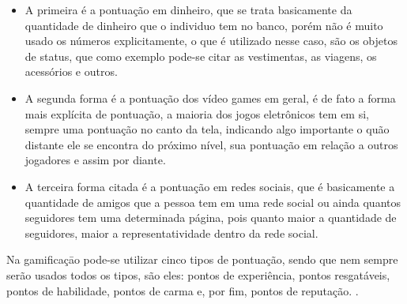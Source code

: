 	 \begin{itemize}
	 	\item  A primeira é a pontuação em dinheiro, que se trata basicamente da quantidade de dinheiro que o individuo tem no banco, porém não é muito usado os números explicitamente, o que é utilizado nesse caso, são os objetos de status, que como exemplo pode-se citar as vestimentas, as viagens, os acessórios e outros.
	 	
	 	\item A segunda forma é a pontuação dos vídeo games em geral, é de fato a forma mais explícita de pontuação, a maioria dos jogos eletrônicos tem em si, sempre uma pontuação no canto da tela, indicando algo importante o quão distante ele se encontra do próximo nível, sua pontuação em relação a outros jogadores e assim por diante.
	 	
	 	\item  A terceira forma citada é a pontuação em redes sociais, que é basicamente a quantidade de amigos que a pessoa tem em uma rede social ou ainda quantos seguidores tem uma determinada página, pois quanto maior a quantidade de seguidores, maior a representatividade dentro da rede social. 
	 \end{itemize}
		
	    Na gamificaçāo pode-se utilizar cinco tipos de pontuação, sendo que nem sempre serão usados todos os tipos, são eles: pontos de experiência, pontos resgatáveis, pontos de habilidade, pontos de carma e, por fim, pontos de reputação.  \cite{zichermann2011gamification}.
	    	
